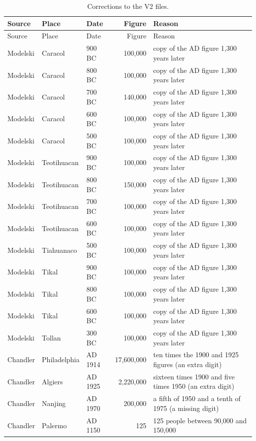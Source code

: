 \documentclass[11pt,a4paper]{article}
\begin{document}
\begin{longtable}{lllrp{6.2cm}}\caption{Corrections to the V2 files.}\label{tab:fixes}\\\toprule Source & Place & Date & Figure & Reason\\\midrule\endfirsthead\toprule Source & Place & Date & Figure & Reason\\\midrule\endhead
Modelski & Caracol & 900 BC & 100,000 & copy of the AD figure 1,300 years later\\
Modelski & Caracol & 800 BC & 100,000 & copy of the AD figure 1,300 years later\\
Modelski & Caracol & 700 BC & 140,000 & copy of the AD figure 1,300 years later\\
Modelski & Caracol & 600 BC & 100,000 & copy of the AD figure 1,300 years later\\
Modelski & Caracol & 500 BC & 100,000 & copy of the AD figure 1,300 years later\\
Modelski & Teotihuacan & 900 BC & 100,000 & copy of the AD figure 1,300 years later\\
Modelski & Teotihuacan & 800 BC & 150,000 & copy of the AD figure 1,300 years later\\
Modelski & Teotihuacan & 700 BC & 100,000 & copy of the AD figure 1,300 years later\\
Modelski & Teotihuacan & 600 BC & 100,000 & copy of the AD figure 1,300 years later\\
Modelski & Tiahuanaco & 500 BC & 100,000 & copy of the AD figure 1,300 years later\\
Modelski & Tikal & 900 BC & 100,000 & copy of the AD figure 1,300 years later\\
Modelski & Tikal & 800 BC & 100,000 & copy of the AD figure 1,300 years later\\
Modelski & Tikal & 600 BC & 100,000 & copy of the AD figure 1,300 years later\\
Modelski & Tollan & 300 BC & 100,000 & copy of the AD figure 1,300 years later\\
Chandler & Philadelphia & AD 1914 & 17,600,000 & ten times the 1900 and 1925 figures (an extra digit)\\
Chandler & Algiers & AD 1925 & 2,220,000 & sixteen times 1900 and five times 1950 (an extra digit)\\
Chandler & Nanjing & AD 1970 & 200,000 & a fifth of 1950 and a tenth of 1975 (a missing digit)\\
Chandler & Palermo & AD 1150 & 125 & 125 people between 90,000 and 150,000\\

\end{longtable}
\end{document}
